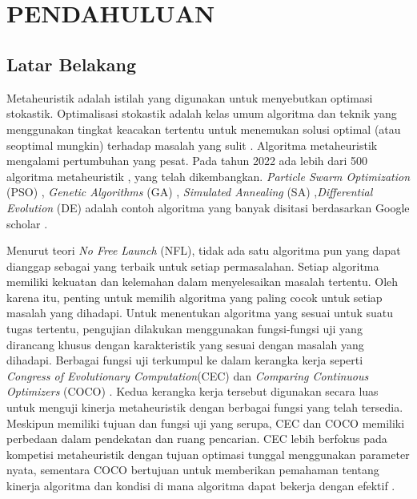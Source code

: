 
\chapter[PENDAHULUAN]{\\ PENDAHULUAN}

\section{Latar Belakang}
Metaheuristik adalah istilah yang digunakan untuk menyebutkan optimasi stokastik. Optimalisasi stokastik adalah kelas umum algoritma dan teknik yang menggunakan tingkat keacakan tertentu untuk menemukan solusi optimal (atau seoptimal mungkin) terhadap masalah yang sulit \citep{Luke2013Metaheuristics}. Algoritma metaheuristik mengalami pertumbuhan yang pesat. Pada tahun 2022 ada lebih dari 500 algoritma metaheuristik \citep{Rajwar_2023}, \citep{Ma_wu_suganthan_song_luo_2023} yang telah dikembangkan. \textit{Particle Swarm Optimization} (PSO) \citep{Kennedy_1995}, \textit{Genetic Algorithms} (GA) \citep{Mitchell_1998}, \textit{Simulated Annealing} (SA) \citep{Kirkpatrick_1983},\textit{Differential Evolution} (DE) \citep{Price2004DifferentialE} adalah contoh algoritma yang banyak disitasi berdasarkan Google scholar \citep{Rajwar_2023}.

Menurut teori \textit{No Free Launch} (NFL), tidak ada satu algoritma pun yang dapat dianggap sebagai yang terbaik untuk setiap permasalahan. Setiap algoritma memiliki kekuatan dan kelemahan dalam menyelesaikan masalah tertentu. Oleh karena itu, penting untuk memilih algoritma yang paling cocok untuk setiap masalah yang dihadapi. Untuk menentukan algoritma yang sesuai untuk suatu tugas tertentu, pengujian dilakukan menggunakan fungsi-fungsi uji yang dirancang khusus dengan karakteristik yang sesuai dengan masalah yang dihadapi. Berbagai fungsi uji terkumpul ke dalam kerangka kerja seperti \textit{Congress of Evolutionary Computation}(CEC) \citep{pro_1999} dan \textit{Comparing Continuous Optimizers} (COCO) \citep{hansen2021coco}. Kedua kerangka kerja tersebut digunakan secara luas untuk menguji kinerja metaheuristik dengan berbagai fungsi yang telah tersedia. Meskipun memiliki tujuan dan fungsi uji yang serupa, CEC dan COCO memiliki perbedaan dalam pendekatan dan ruang pencarian. CEC lebih berfokus pada kompetisi metaheuristik dengan tujuan optimasi tunggal menggunakan parameter nyata, sementara COCO bertujuan untuk memberikan pemahaman tentang kinerja algoritma dan kondisi di mana algoritma dapat bekerja dengan efektif \citep{_kvorc_2020}.

